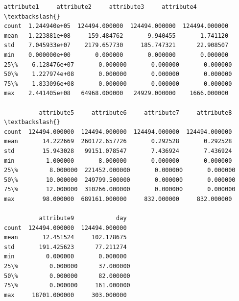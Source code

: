 \documentclass[11pt]{article}
\makeatletter
\newcommand{\boxspacing}{\kern\kvtcb@left@rule\kern\kvtcb@boxsep}
\newcommand{\prompt}[4]{
        \ttfamily\llap{{\color{#2}[#3]:\hspace{3pt}#4}}\vspace{-\baselineskip}
    }
\makeatother
\begin{document}
            \begin{tcolorbox}[breakable, size=fbox, boxrule=.5pt, pad at break*=1mm, opacityfill=0]
\prompt{Out}{outcolor}{7}{\boxspacing}
\begin{Verbatim}[commandchars=\\\{\}]
         attribute1     attribute2     attribute3     attribute4  \textbackslash{}
count  1.244940e+05  124494.000000  124494.000000  124494.000000
mean   1.223881e+08     159.484762       9.940455       1.741120
std    7.045933e+07    2179.657730     185.747321      22.908507
min    0.000000e+00       0.000000       0.000000       0.000000
25\%    6.128476e+07       0.000000       0.000000       0.000000
50\%    1.227974e+08       0.000000       0.000000       0.000000
75\%    1.833096e+08       0.000000       0.000000       0.000000
max    2.441405e+08   64968.000000   24929.000000    1666.000000

          attribute5     attribute6     attribute7     attribute8  \textbackslash{}
count  124494.000000  124494.000000  124494.000000  124494.000000
mean       14.222669  260172.657726       0.292528       0.292528
std        15.943028   99151.078547       7.436924       7.436924
min         1.000000       8.000000       0.000000       0.000000
25\%         8.000000  221452.000000       0.000000       0.000000
50\%        10.000000  249799.500000       0.000000       0.000000
75\%        12.000000  310266.000000       0.000000       0.000000
max        98.000000  689161.000000     832.000000     832.000000

          attribute9            day
count  124494.000000  124494.000000
mean       12.451524     102.178675
std       191.425623      77.211274
min         0.000000       0.000000
25\%         0.000000      37.000000
50\%         0.000000      82.000000
75\%         0.000000     161.000000
max     18701.000000     303.000000
\end{Verbatim}
\end{tcolorbox}
        
\end{document}
